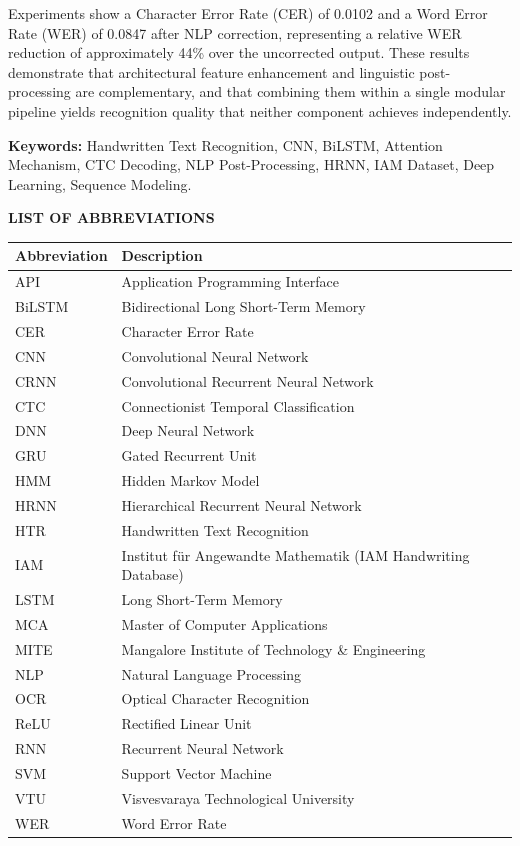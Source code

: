 Experiments show a Character Error Rate (CER) of 0.0102 and a Word Error Rate (WER) of 0.0847 after NLP correction, representing a relative WER reduction of approximately 44\% over the uncorrected output. These results demonstrate that architectural feature enhancement and linguistic post-processing are complementary, and that combining them within a single modular pipeline yields recognition quality that neither component achieves independently.

\vspace{1.0cm}
\noindent \textbf{Keywords:} Handwritten Text Recognition, CNN, BiLSTM, Attention Mechanism, CTC Decoding, NLP Post-Processing, HRNN, IAM Dataset, Deep Learning, Sequence Modeling.

\newpage

\begin{center}
    \Large{\textbf{LIST OF ABBREVIATIONS}} \\
    \vspace{1.0cm}
\end{center}
\begin{longtable}{ll}
    \textbf{Abbreviation} & \textbf{Description} \\
    \midrule
    API & Application Programming Interface \\
    BiLSTM & Bidirectional Long Short-Term Memory \\
    CER & Character Error Rate \\
    CNN & Convolutional Neural Network \\
    CRNN & Convolutional Recurrent Neural Network \\
    CTC & Connectionist Temporal Classification \\
    DNN & Deep Neural Network \\
    GRU & Gated Recurrent Unit \\
    HMM & Hidden Markov Model \\
    HRNN & Hierarchical Recurrent Neural Network \\
    HTR & Handwritten Text Recognition \\
    IAM & Institut f{\"u}r Angewandte Mathematik (IAM Handwriting Database) \\
    LSTM & Long Short-Term Memory \\
    MCA & Master of Computer Applications \\
    MITE & Mangalore Institute of Technology \& Engineering \\
    NLP & Natural Language Processing \\
    OCR & Optical Character Recognition \\
    ReLU & Rectified Linear Unit \\
    RNN & Recurrent Neural Network \\
    SVM & Support Vector Machine \\
    VTU & Visvesvaraya Technological University \\
    WER & Word Error Rate \\
\end{longtable}

